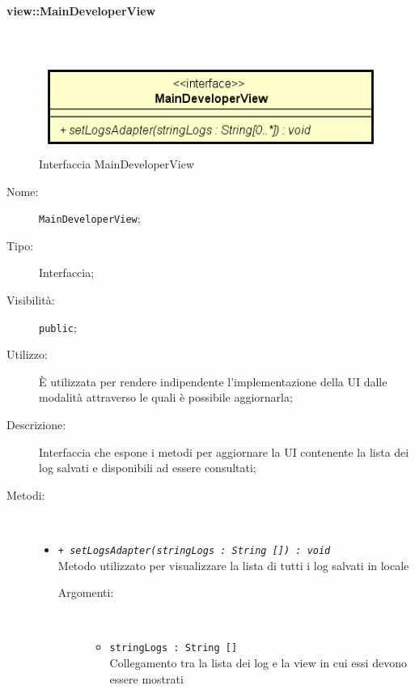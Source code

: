\documentclass[../DefinizioneDiProdotto.tex]{subfiles}
\begin{document}
\paragraph{view::MainDeveloperView}
\
\begin{figure}[H]
	\centering
	\includegraphics[width=\maxwidth]{img/MainDeveloperView.png}
	\caption{Interfaccia MainDeveloperView}\label{fig:view::MainDeveloperView} 
\end{figure}
\begin{description}
	\item[Nome:] \texttt{MainDeveloperView};
	\item[Tipo:] Interfaccia;
	\item[Visibilità:] \texttt{public};
	\item[Utilizzo:] È utilizzata per rendere indipendente l'implementazione della UI dalle modalità attraverso le quali è possibile aggiornarla;
	\item[Descrizione:] Interfaccia che espone i metodi per aggiornare la UI contenente la lista dei log salvati e disponibili ad essere consultati;
	\item[Metodi:] \
	\begin{itemize}
		\item \texttt{+ \textit{setLogsAdapter(stringLogs : String []) : void}}\\
		Metodo utilizzato per visualizzare la lista di tutti i log salvati in locale
		\begin{description}
			\item[Argomenti:] \
			\begin{itemize}
				\item \texttt{stringLogs : String []}\\
				Collegamento tra la lista dei log e la view in cui essi devono essere mostrati\end{itemize}
		\end{description}
	\end{itemize}
\end{description}
\end{document}
